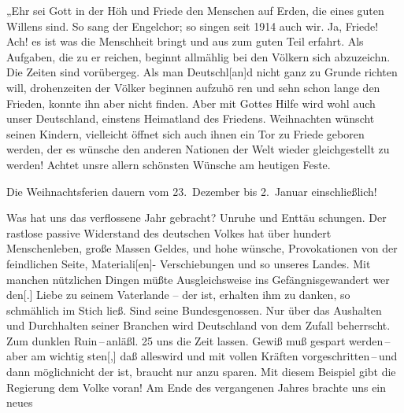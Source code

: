 

%
„Ehr sei Gott in der Höh und Friede den Menschen auf Erden,\ob
die eines guten Willens sind. So sang der Engelchor; so singen\ob
seit 1914 auch wir. Ja, Friede! Ach! es ist was die Menschheit bringt\ob
und aus zum guten Teil erfahrt. Als Aufgaben, die zu er\ohb
reichen, beginnt allmählig bei den Völkern sich abzuzeichn. Die\ob
Zeiten sind vorübergeg. Als man Deutschl{[an]}d nicht ganz zu\ob
Grunde richten will, drohenzeiten der Völker beginnen aufzuhö\ohb
ren und sehn schon lange den Frieden, konnte ihn aber nicht finden.\ob
Aber mit Gottes Hilfe wird wohl auch unser Deutschland, einstens\ob
Heimatland des Friedens\unsicher. Weihnachten wünscht seinen\ob
Kindern, vielleicht öffnet sich auch ihnen ein Tor zu Friede\unsicher\ob
geboren werden, der es wünsche\unsicher{} den anderen Nationen\ob
der Welt wieder gleichgestellt zu werden! Achtet unsre allern\ohb
schönsten Wünsche am heutigen Feste.

Die Weihnachtsferien dauern vom 23.\ Dezember\ob
bis 2.\ Januar einschließlich!



Was hat uns das verflossene Jahr gebracht? Unruhe und Enttäu\ohb
schungen. Der rastlose passive Widerstand des deutschen Volkes hat\ob
über hundert Menschenleben, große Massen Geldes, und hohe\unsicher\ob
wünsche, Provokationen von der feindlichen Seite, Materiali{[en]}-\ob
Verschiebungen und so unseres Landes. Mit manchen nützlichen\ob
Dingen müßte Ausgleichsweise ins Gefängnis\unsicher gewandert wer\ohb
den[.] Liebe zu seinem Vaterlande – der\unsicher{} ist, erhalten ihm zu\ob
danken, so schmählich im Stich ließ. Sind seine Bundesgenossen.\ob
Nur über das Aushalten und Durchhalten seiner Branchen wird\ob
Deutschland von dem Zufall beherrscht. Zum dunklen Ruin\,--\,anläßl. 25%
uns die Zeit lassen. Gewiß muß gespart werden\,--\,aber am wichtig\ohb
sten[,] daß alles\unsicher wird und mit vollen Kräften vorgeschritten\,--\,und dann\unsicher\ob
möglich\unsicher nicht\unsicher{} der ist, braucht nur an\unsicher zu sparen. Mit diesem Beispiel\ob
gibt die Regierung dem Volke voran!\ob
Am Ende des vergangenen Jahres brachte uns ein neues
\pend
